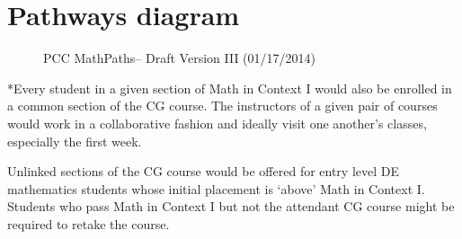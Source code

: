 \chapter{Pathways diagram}\label{app:sec:pathways}

\begin{figure}[!htb]
  \centering
  
  \caption{PCC MathPaths-- Draft Version III (01/17/2014)}
\end{figure}

*Every student in a given section of Math in Context I 
would also be enrolled in a common section of the CG 
course.  The instructors of a given pair of courses 
would work in a collaborative fashion and ideally visit 
one another's classes, especially the first week. 

Unlinked sections of the CG course would be offered 
for entry level DE mathematics students whose initial 
placement is `above' Math in Context I.  Students who 
pass Math in Context I but not the attendant CG course 
might be required to retake the course. 

